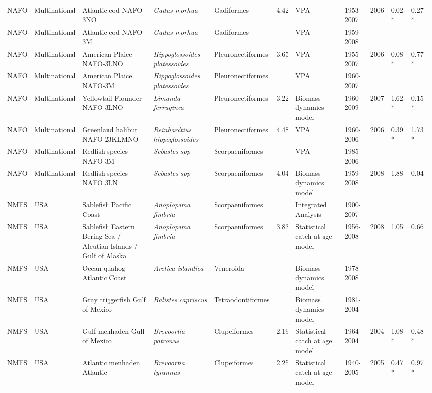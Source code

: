 \begin{longtable}{p{1.5cm}p{1.5cm}p{3cm}p{3cm}p{2.5cm}p{0.9cm}p{1.4cm}p{0.9cm}p{0.9cm}p{0.9cm}p{1cm}}
  NAFO & Multinational & Atlantic cod NAFO 3NO & \textit{Gadus morhua} & Gadiformes & 4.42 & VPA & 1953-2007 & 2006 & 0.02 * & 0.27 * \\ 
  NAFO & Multinational & Atlantic cod NAFO 3M & \textit{Gadus morhua} & Gadiformes &  & VPA & 1959-2008 &  &  &  \\ 
  NAFO & Multinational & American Plaice NAFO-3LNO & \textit{Hippoglossoides platessoides} & Pleuronectiformes & 3.65 & VPA & 1955-2007 & 2006 & 0.08 * & 0.77 * \\ 
  NAFO & Multinational & American Plaice NAFO-3M & \textit{Hippoglossoides platessoides} & Pleuronectiformes &  & VPA & 1960-2007 &  &  &  \\ 
  NAFO & Multinational & Yellowtail Flounder NAFO 3LNO & \textit{Limanda ferruginea} & Pleuronectiformes & 3.22 & Biomass dynamics model & 1960-2009 & 2007 & 1.62 * & 0.15 * \\ 
  NAFO & Multinational & Greenland halibut NAFO 23KLMNO & \textit{Reinhardtius hippoglossoides} & Pleuronectiformes & 4.48 & VPA & 1960-2006 & 2006 & 0.39 * & 1.73 * \\ 
  NAFO & Multinational & Redfish species NAFO 3M & \textit{Sebastes spp} & Scorpaeniformes &  & VPA & 1985-2006 &  &  &  \\ 
  NAFO & Multinational & Redfish species NAFO 3LN & \textit{Sebastes spp} & Scorpaeniformes & 4.04 & Biomass dynamics model & 1959-2008 & 2008 & 1.88 & 0.04 \\ 
  NMFS & USA & Sablefish Pacific Coast & \textit{Anoplopoma fimbria} & Scorpaeniformes &  & Integrated Analysis & 1900-2007 &  &  &  \\ 
  NMFS & USA & Sablefish Eastern Bering Sea / Aleutian Islands / Gulf of Alaska & \textit{Anoplopoma fimbria} & Scorpaeniformes & 3.83 & Statistical catch at age model & 1956-2008 & 2008 & 1.05 & 0.66 \\ 
  NMFS & USA & Ocean quahog Atlantic Coast & \textit{Arctica islandica} & Veneroida &  & Biomass dynamics model & 1978-2008 &  &  &  \\ 
  NMFS & USA & Gray triggerfish Gulf of Mexico & \textit{Balistes capriscus} & Tetraodontiformes &  & Biomass dynamics model & 1981-2004 &  &  &  \\ 
  NMFS & USA & Gulf menhaden Gulf of Mexico & \textit{Brevoortia patronus} & Clupeiformes & 2.19 & Statistical catch at age model & 1964-2004 & 2004 & 1.08 * & 0.48 * \\ 
  NMFS & USA & Atlantic menhaden Atlantic & \textit{Brevoortia tyrannus} & Clupeiformes & 2.25 & Statistical catch at age model & 1940-2005 & 2005 & 0.47 * & 0.97 * \\ 

\end{longtable}
